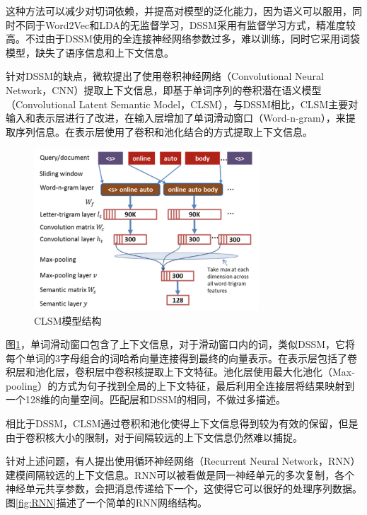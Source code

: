 这种方法可以减少对切词依赖，并提高对模型的泛化能力，因为语义可以服用，同时不同于Word2Vec和LDA的无监督学习，DSSM采用有监督学习方式，精准度较高。不过由于DSSM使用的全连接神经网络参数过多，难以训练，同时它采用词袋模型，缺失了语序信息和上下文信息。

针对DSSM的缺点，微软提出了使用卷积神经网络\cite{lecun1998gradient}（Convolutional Neural Network，CNN）提取上下文信息，即基于单词序列的卷积潜在语义模型\cite{Shen2014ALS}（Convolutional Latent Semantic Model，CLSM），与DSSM相比，CLSM主要对输入和表示层进行了改进，在输入层增加了单词滑动窗口（Word-n-gram），来提取序列信息。在表示层使用了卷积和池化结合的方式提取上下文信息。

\begin{figure}[htbp!]
\vspace{1em}
\centering
\includegraphics[width=0.75\textwidth]{figures/CLSM.jpg}
\caption{CLSM模型结构}\label{fig:CLSM}
\vspace{1em}
\end{figure}


图\ref{fig:CLSM}，单词滑动窗口包含了上下文信息，对于滑动窗口内的词，类似DSSM，它将每个单词的3字母组合的词哈希向量连接得到最终的向量表示。在表示层包括了卷积层和池化层，卷积层中卷积核提取上下文特征。池化层使用最大化池化（Max-pooling）的方式为句子找到全局的上下文特征，最后利用全连接层将结果映射到一个128维的向量空间。匹配层和DSSM的相同，不做过多描述。

相比于DSSM，CLSM通过卷积和池化使得上下文信息得到较为有效的保留，但是由于卷积核大小的限制，对于间隔较远的上下文信息仍然难以捕捉。

针对上述问题，有人提出使用循环神经网络（Recurrent Neural Network，RNN）建模间隔较远的上下文信息。RNN可以被看做是同一神经单元的多次复制，各个神经单元共享参数，会把消息传递给下一个，这使得它可以很好的处理序列数据。图\ref{fig:RNN}描述了一个简单的RNN网络结构。

